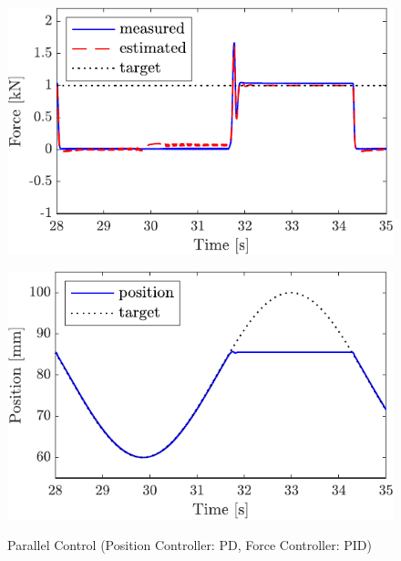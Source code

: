 \begin{figure}[t]
    \begin{minipage}{\minipageratio\hsize}
    \centering
        \includegraphics[keepaspectratio, scale = \minifigscale]{contents/IntegrationControl/figure/SECASQ/crop-FBsw_PID_force.pdf}
        \label{fig5:crop-FBsw_PID_force}
    \end{minipage}
    \begin{minipage}{\minipageratio\hsize}
    \centering
        \includegraphics[keepaspectratio, scale = \minifigscale]
        {contents/IntegrationControl/figure/SECASQ/crop-FBsw_PID_pos.pdf}
        \label{fig5:crop-FBsw_PID_pos}
    \end{minipage}
    \caption{Parallel Control (Position Controller: PD, Force Controller: PID)}   
    \label{fig5:crop-FBsw_PID}
\end{figure}


